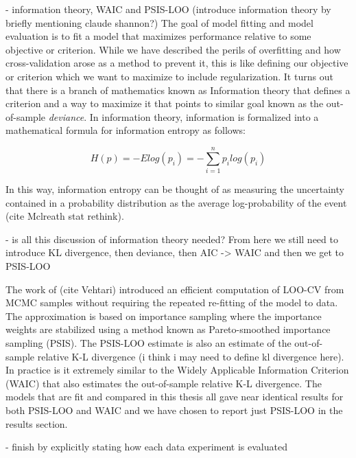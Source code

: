 - information theory, WAIC and PSIS-LOO
(introduce information theory by briefly mentioning claude shannon?)
The goal of model fitting and model evaluation is to fit a model that maximizes performance relative to some objective or criterion. While we have described the perils of overfitting and how cross-validation arose as a method to prevent it, this is like defining our objective or criterion which we want to maximize to include regularization. It turns out that there is a branch of mathematics known as Information theory that defines a criterion and a way to maximize it that points to similar goal known as the out-of-sample \textit{deviance}. In information theory, information is formalized into a mathematical formula for information entropy as follows:

\begin{equation}
H(p) = -Elog(p_i) = - \sum_{i=1}^{n} p_i log(p_i)
\end{equation}

In this way, information entropy can be thought of as measuring the uncertainty contained in a probability distribution as the average log-probability of the event (cite Mclreath stat rethink).

- is all this discussion of information theory needed? From here we still need to introduce KL divergence, then deviance, then AIC -> WAIC and then we get to PSIS-LOO

The work of (cite Vehtari) introduced an efficient computation of LOO-CV from MCMC samples without requiring the repeated re-fitting of the model to data. The approximation is based on importance sampling where the importance weights are stabilized using a method known as Pareto-smoothed importance sampling (PSIS). The PSIS-LOO estimate is also an estimate of the out-of-sample relative K-L divergence (i think i may need to define kl divergence here). In practice is it extremely similar to the Widely Applicable Information Criterion (WAIC) that also estimates the out-of-sample relative K-L divergence. The models that are fit and compared in this thesis all gave near identical results for both PSIS-LOO and WAIC and we have chosen to report just PSIS-LOO in the results section.

- finish by explicitly stating how each data experiment is evaluated
